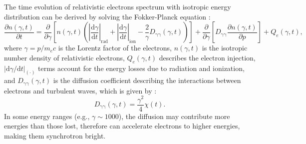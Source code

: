 \documentclass[modern]{aastex61}
\newcommand{\R}[1]{\mathrm{#1}}
\newcommand{\D}[1]{\R{d} #1}
\newcommand{\diff}[2]{\frac{\D{#1}}{\D{#2}}}
\newcommand{\pdiff}[2]{\frac{\partial #1}{\partial #2}}
\begin{document}
The time evolution of relativistic electrons spectrum with isotropic energy
distribution can be derived by solving the Fokker-Planck equation
\citep{eilek1991,schlickeiser2002}:
\begin{equation}
  \label{eq:fokkerplanck}
  \pdiff{n(\gamma,t)}{t} = \pdiff{}{\gamma} \left[ n(\gamma,t) \left(
      \left| \diff{\gamma}{t} \right|_{\R{rad}} +
      \left| \diff{\gamma}{t} \right|_{\R{ion}} -
      \frac{2}{\gamma} D_{\R{\gamma\gamma}}(\gamma, t) \right) \right] +
  \pdiff{}{\gamma} \left[ D_{\R{\gamma\gamma}} \pdiff{n(\gamma,t)}{p} \right] +
  Q_e(\gamma,t),
\end{equation}
where $\gamma = p / m_e c$ is the Lorentz factor of the electrons,
$n(\gamma, t)$ is the isotropic number density of relativistic
electrons, $Q_e(\gamma, t)$ describes the electron injection,
$|\R{d}\gamma / \R{d}t|_{(\cdot)}$ terms account for the
energy losses due to radiation and ionization,
and $D_{\R{\gamma\gamma}}(\gamma, t)$ is the diffusion coefficient
describing the interactions between electrons and turbulent waves,
which is given by \citep{brunetti2011}:
\begin{equation}
  \label{eq:diffusion-coef}
  D_{\R{\gamma\gamma}}(\gamma, t) = \frac{\gamma^2}{4} \chi(t).
\end{equation}
In some energy ranges (e.g., $\gamma \sim 1000$), the diffusion may
contribute more energies than those lost, therefore can accelerate electrons
to higher energies, making them synchrotron bright.
\end{document}
